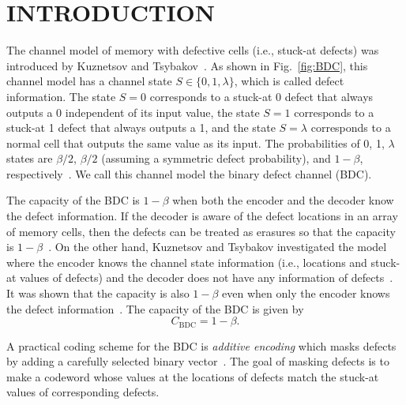\documentclass[10pt,twocolumn,twoside,submit]{JCNtran}
\begin{document}
\section{\uppercase{Introduction}}

	The channel model of memory with defective cells (i.e., stuck-at defects) was introduced by Kuznetsov and Tsybakov~\cite{Kuznetsov1974}. As shown in Fig.~\ref{fig:BDC}, this channel model has a channel state $S \in \{0, 1, \lambda\}$, which is called defect information. The state $S=0$ corresponds to a stuck-at 0 defect that always outputs a 0 independent of its input value, the state $S=1$ corresponds to a stuck-at 1 defect that always outputs a 1, and the state $S = \lambda$ corresponds to a normal cell that outputs the same value as its input. The probabilities of 0, 1, $\lambda$ states are $\beta/2$, $\beta/2$ (assuming a symmetric defect probability), and $1 - \beta$, respectively~\cite{Kuznetsov1974, ElGamal2011}. We call this channel model the binary defect channel (BDC).  
	
	The capacity of the BDC is $1 - \beta$ when both the encoder and the decoder know the defect information. If the decoder is aware of the defect locations in an array of memory cells, then the defects can be treated as erasures so that the capacity is $1 - \beta$~\cite{Heegard1983capacity, ElGamal2011}. On the other hand, Kuznetsov and Tsybakov investigated the model where the encoder knows the channel state information (i.e., locations and stuck-at values of defects) and the decoder does not have any information of defects~\cite{Kuznetsov1974}. It was shown that the capacity is also $1 - \beta$ even when only the encoder knows the defect information~\cite{Kuznetsov1974, Heegard1983capacity}. The capacity of the BDC is given by 	
	\begin{equation}\label{eq:BDC_capacity}
		C_{\mathrm{BDC}} = 1 - \beta. 
	\end{equation}

	A practical coding scheme for the BDC is \emph{additive encoding} which masks defects by adding a carefully selected binary vector~\cite{Kuznetsov1974, Tsybakov1975additive, Dumer1990}. The goal of masking defects is to make a codeword whose values at the locations of defects match the stuck-at values of corresponding defects. %
	
\end{document}
